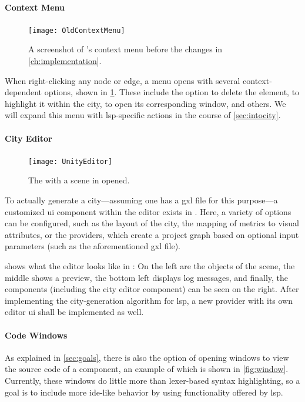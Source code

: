\documentclass[../thesis]{subfiles}
\begin{document}
\paragraph{Context Menu}

\begin{figure}[htbp]
	\begin{center}
		\texttt{[image: OldContextMenu]}
	\end{center}
	\caption{A screenshot of \SEE{}'s context menu before the changes in \cref{ch:implementation}.}\label{fig:oldcontext}
\end{figure}

When right-clicking any node or edge, a menu opens with several context-dependent options, shown in \cref{fig:oldcontext}.
These include the option to delete the element, to highlight it within the \gls{city}, to open its corresponding \gls{window}, and others.
We will expand this menu with \gls{lsp}-specific actions in the course of \cref{sec:intocity}.

\paragraph{City Editor}

\begin{figure}[htbp]
	\begin{center}
		\texttt{[image: UnityEditor]}
	\end{center}
	\caption{The  with a scene in \SEE{} opened.}\label{fig:editor}
\end{figure}

To actually generate a \gls{city}---assuming one has a \gls{gxl} file for this purpose---a customized \gls{ui} component within the \gls{editor} exists in \SEE{}.
Here, a variety of options can be configured, such as the layout of the city, the mapping of metrics to visual attributes, or the \glspl*{provider}, which create a project graph based on optional input parameters (such as the aforementioned \gls{gxl} file).

 shows what the \gls{editor} looks like in \SEE{}:
On the left are the objects of the scene, the middle shows a preview, the bottom left displays log messages, and finally, the components (including the city editor component) can be seen on the right.
After implementing the city-generation algorithm for \gls{lsp}, a new \gls{provider} with its own \gls{editor} \gls{ui} shall be implemented as well.

\paragraph{Code Windows}
As explained in \cref{sec:goals}, there is also the option of opening \glspl{window} to view the source code of a component, an example of which is shown in \cref{fig:window}.
Currently, these windows do little more than lexer-based syntax highlighting, so a goal is to include more \gls{ide}-like behavior by using functionality offered by \gls{lsp}.
\end{document}
